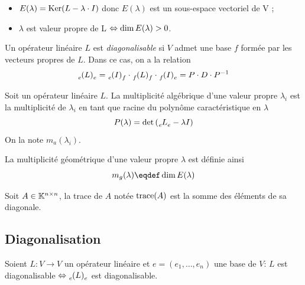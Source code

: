 \begin{myrem}
	\InsertTheoremBreak
	\begin{itemize}
		\item $E(\lambda) = \operatorname{Ker} (L - \lambda \cdot I)$ donc $E(\lambda)$ est un sous-espace vectoriel de V ;
		\item $\lambda$ est valeur propre de L $\Leftrightarrow \operatorname{dim} E(\lambda) > 0$.
	\end{itemize}
\end{myrem}

\begin{mydef}
	Un opérateur linéaire $L$ est \emph{diagonalisable} si $V$ admet une base $f$ formée par les vecteurs propres de $L$. Dans ce cas, on a la relation
	\[ \tensor*[_e]{(L)}{_e}
	= \tensor*[_e]{(I)}{_f} \cdot \tensor*[_f]{(L)}{_f} \cdot \tensor*[_f]{(I)}{_e}
	= P \cdot D \cdot P^{-1} \]
\end{mydef}

\begin{mydef}
	Soit un opérateur linéaire $L$.
	La multiplicité algébrique d'une valeur propre $\lambda_i$ est la multiplicité de $\lambda_i$ en tant que racine du polynôme caractéristique en $\lambda$
	\[ P(\lambda) = \det \left( \tensor*[_e]{L}{_e} - \lambda I \right) \]
	On la note $m_a(\lambda_i)$.
\end{mydef}

\begin{mydef}
	La multiplicité géométrique d'une valeur propre $\lambda$ est définie ainsi
	\[ m_g(\lambda) \eqdef \newdim E(\lambda) \]
\end{mydef}

\begin{mydef}
	Soit $A \in \mathbb{K}^{n \times n}$,
	la trace de $A$ notée $\operatorname{trace}(A)$ est la somme des éléments de sa diagonale.
\end{mydef}

\subsection{Diagonalisation}

\begin{myprop}
	Soient $L : V \to V$ un opérateur linéaire et $e = (e_1, \dots, e_n)$ une base de $V$:
	$L$ est diagonalisable $\Leftrightarrow \tensor[_e]{(L)}{_e}$ est diagonalisable.
\end{myprop}

